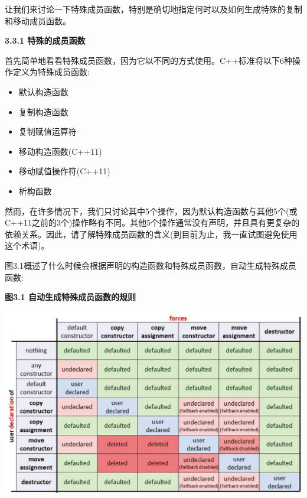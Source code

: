 让我们来讨论一下特殊成员函数，特别是确切地指定何时以及如何生成特殊的复制和移动成员函数。\par

\hspace*{\fill} \par %
\textbf{3.3.1 特殊的成员函数}

首先简单地看看特殊成员函数，因为它以不同的方式使用。C++标准将以下6种操作定义为特殊成员函数:\par

\begin{itemize}
	\item 默认构造函数
	\item 复制构造函数
	\item 复制赋值运算符
	\item 移动构造函数(C++11)
	\item 移动赋值操作符(C++11)
	\item 析构函数
\end{itemize}

然而，在许多情况下，我们只讨论其中5个操作，因为默认构造函数与其他5个(或C++11之前的3个)操作略有不同。其他5个操作通常没有声明，并且具有更复杂的依赖关系。因此，请了解特殊成员函数的含义(到目前为止，我一直试图避免使用这个术语)。\par

图3.1概述了什么时候会根据声明的构造函数和特殊成员函数，自动生成特殊成员函数:\par

\hspace*{\fill} \par %
\textbf{图3.1 自动生成特殊成员函数的规则}\par

\begin{center}
	\includegraphics[width=1.0\textwidth]{content/1/chapter3/images/1}
\end{center}

